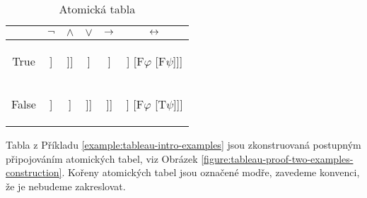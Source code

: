 \begin{table}[htbp]
\centering
\begin{tabular}{@{}c||c|c|c|c|c@{}}
 & $\neg$ & $\land$ & $\lor$ & $\mathbin{\rightarrow}$ & $\mathbin{\leftrightarrow}$  \\ \midrule \midrule
True
&  
\begin{forest}
[$\mathrm{T}\neg\varphi$ [$\mathrm{F}\varphi$]]
\end{forest}
&  
\begin{forest}
[$\mathrm{T}\varphi\land\psi$ [$\mathrm{T}\varphi$ [$\mathrm{T}\psi$]]]
\end{forest}
& 
\begin{forest}
[$\mathrm{T}\varphi\lor\psi$ [$\mathrm{T}\varphi$] [$\mathrm{T}\psi$]]
\end{forest}
&
\begin{forest}
[$\mathrm{T}\varphi\limplies\psi$ [$\mathrm{F}\varphi$] [$\mathrm{T}\psi$]]
\end{forest}
&  
\begin{forest}
[$\mathrm{T}\varphi\liff\psi$ [$\mathrm{T}\varphi$ [$\mathrm{T}\psi$]] [$\mathrm{F}\varphi$ [$\mathrm{F}\psi$]]]
\end{forest}
\\ \midrule
False 
& 
\begin{forest}
[$\mathrm{F}\neg\varphi$ [$\mathrm{T}\varphi$]]
\end{forest}
&
\begin{forest}
[$\mathrm{F}\varphi\land\psi$ [$\mathrm{F}\varphi$] [$\mathrm{F}\psi$]]
\end{forest}
&
\begin{forest}
[$\mathrm{F}\varphi\lor\psi$ [$\mathrm{F}\varphi$ [$\mathrm{F}\psi$]]]
\end{forest}
&
\begin{forest}
[$\mathrm{F}\varphi\limplies\psi$ [$\mathrm{T}\varphi$ [$\mathrm{F}\psi$]]]
\end{forest}
&
\begin{forest}
[$\mathrm{F}\varphi\liff\psi$ [$\mathrm{T}\varphi$ [$\mathrm{F}\psi$]] [$\mathrm{F}\varphi$ [$\mathrm{T}\psi$]]]
\end{forest}
\end{tabular}
\caption{Atomická tabla}
\label{table:atomic-tableaux}
\end{table}

Tabla z Příkladu \ref{example:tableau-intro-examples} jsou zkonstruovaná postupným připojováním atomických tabel, viz Obrázek \ref{figure:tableau-proof-two-examples-construction}. Kořeny atomických tabel jsou označené modře, zavedeme konvenci, že je nebudeme zakreslovat.

